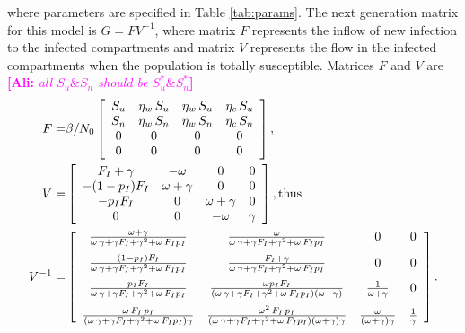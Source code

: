\documentclass[12pt]{article}
\newcommand{\comment}{\showcomment}
\newcommand{\showcomment}[3]{\textcolor{#1}{\textbf{[#2: }\textsl{#3}\textbf{]}}}
\newcommand{\ali}[1]{\comment{magenta}{Ali}{#1}}
\theoremstyle{definition} %
\begin{document}
where parameters are specified in Table \ref{tab:params}. The next generation matrix for this model is $G = F V^{-1}$, where matrix $F$ represents the inflow of new infection to the infected compartments and matrix $V$ represents the flow in the infected compartments when the population is totally susceptible. 
Matrices $F$ and $V$ are \ali{all $S_u \& S_n$ should be $S_u^* \& S_n^*$}
\begin{align}
\label{FV}
F =& \beta/N_0 \left[ \begin {array}{cccc} 
S_u&\eta_w\,S_u&\eta_w\,S_u&\eta_c\,S_u\\
S_n&\eta_w\,S_n&\eta_w\,S_n&\eta_c\,S_n\\ 
0&0&0&0\\
0&0&0&0
 \end {array} \right], \\
  V =&
 \left[ \begin {array}{cccc}  
F_I+\gamma&-\omega&0&0\\
-(1-p_I)F_I&\omega+\gamma&0&0\\
-p_I F_I&0&\omega+\gamma&0\\
0&0&-\omega&\gamma
\end {array} \right], \text{thus}\\
V^{-1} =&
\left[ \begin {array}{cccc}
\frac {\omega+\gamma}{\omega\,\gamma+\gamma F_I+\gamma^2+\omega\, F_I p_I}&\frac {\omega}{\omega\,\gamma+\gamma F_I+\gamma^2+\omega\, F_I p_I}&0&0\\
\noalign{\medskip}
\frac{(1-p_I) F_I}{\omega\,\gamma+\gamma F_I+\gamma^2+\omega\, F_I p_I}&
\frac{F_I+\gamma}{\omega\,\gamma+\gamma F_I+\gamma^2+\omega\, F_I p_I}&0&0\\
\noalign{\medskip}
\frac{p_I F_I}{\omega\,\gamma+\gamma F_I+\gamma^2+\omega\, F_I p_I}&
\frac{\omega p_I F_I}{(\omega\,\gamma+\gamma F_I+\gamma^2+\omega\, F_I p_I)(\omega+\gamma)}& \frac{1}{\omega+\gamma}&0 \\
\noalign{\medskip}
\frac{\omega\,F_I\,p_I}{(\omega\,\gamma+\gamma F_I+\gamma^2+\omega\, F_I p_I) \gamma}& 
\frac{\omega^2\,F_I\,p_I}{(\omega\,\gamma+\gamma F_I+\gamma^2+\omega\, F_I p_I)(\omega+\gamma) \gamma}&
\frac{\omega}{(\omega+\gamma) \gamma}&
\frac{1}{\gamma}
\end {array} \right].
\end{align}
\end{document}
